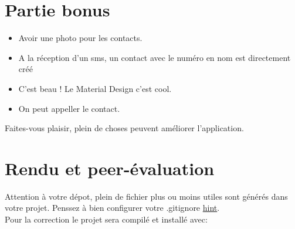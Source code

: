 \documentclass{42}
\begin{document}
\chapter{Partie bonus}

	\begin{itemize}\itemsep1pt
		\item Avoir une photo pour les contacts.
		\item A la r\'eception d'un sms, un contact avec le num\'ero en nom est directement cr\'e\'e
		\item C'est beau ! Le Material Design c'est cool.
		\item On peut appeller le contact.
	\end{itemize}
	\vspace{10mm}
	Faites-vous plaisir, plein de choses peuvent am\'eliorer l'application.

\chapter{Rendu et peer-\'evaluation}

	Attention \`a votre d\'epot, plein de fichier plus ou moins utiles sont
	g\'en\'er\'es dans votre projet. Penssez \`a bien configurer votre
	.gitignore \href{https://www.gitignore.io}{hint}.\\
	
	\vspace{5mm}
	Pour la correction le projet sera compil\'e et install\'e avec:\\
\end{document}
